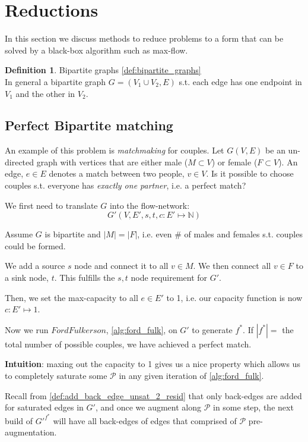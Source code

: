 \documentclass{article}
\theoremstyle{definition}
\newtheorem{definition}{Definition}[section]
\begin{document}
\section{Reductions}
In this section we discuss methods to reduce problems to a form that can be solved by a black-box algorithm such as max-flow.

\begin{definition}{Bipartite graphs}
\ref{def:bipartite_graphs}
	\\In general a bipartite graph $G=(V_1 \cup V_2, E)$ s.t. each edge has one endpoint in $V_1$ and the other in $V_2$.
\end{definition}

\subsection{Perfect Bipartite matching}
An example of this problem is \textit{matchmaking} for couples. Let $G(V,E)$ be an un-directed graph with vertices that are either male ($M \subset V$) or female ($F \subset V$). An edge, $e \in E$ denotes a match between two people, $v \in V$. Is it possible to choose couples s.t. everyone has \textit{exactly one partner}, i.e. a perfect match?

We first need to translate $G$ into the flow-network: $$G'(V,E',s,t,c: E' \mapsto \mathbb{N})$$

Assume $G$ is bipartite and $|M|=|F|$, i.e. even \# of males and females s.t. couples could be formed.

We add a source $s$ node and connect it to all $v \in M$. We then connect all $v \in F$ to a sink node, $t$. This fulfills the $s,t$ node requirement for $G'$.

Then, we set the max-capacity to all $e \in E'$ to 1, i.e. our capacity function is now $c : E' \mapsto 1$.

Now we run $FordFulkerson$, \ref{alg:ford_fulk}, on $G'$ to generate $f^*$. If $|f^*| = $ the total number of possible couples, we have achieved a perfect match.

\textbf{Intuition}: maxing out the capacity to 1 gives us a nice property which allows us to completely saturate some $\mathcal{P}$ in any given iteration of \ref{alg:ford_fulk}. 

Recall from \ref{def:add_back_edge_unsat_2_resid} that only back-edges are added for saturated edges in $G'$, and once we augment along $\mathcal{P}$ in some step, the next build of ${G'}^{f^*}$ will have all back-edges of edges that comprised of $\mathcal{P}$ pre-augmentation. 
\end{document}
